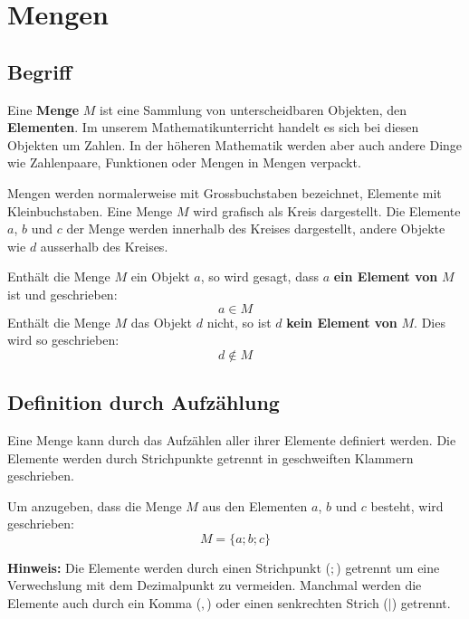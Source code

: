 \newpage
\section{Mengen}

\subsection{Begriff}
Eine \textbf{Menge} $M$ ist eine Sammlung von unterscheidbaren Objekten, den \textbf{Elementen}. Im unserem Mathematikunterricht handelt es sich bei diesen Objekten um Zahlen. In der höheren Mathematik werden aber auch andere Dinge wie Zahlenpaare, Funktionen oder Mengen in Mengen verpackt.


Mengen werden normalerweise mit Grossbuchstaben bezeichnet, Elemente mit Kleinbuchstaben. Eine Menge $M$ wird grafisch als Kreis dargestellt. Die Elemente $a$, $b$  und $c$ der Menge werden innerhalb des Kreises dargestellt, andere Objekte wie $d$ ausserhalb des Kreises.
\begin{center}
\end{center}
Enthält die Menge $M$ ein Objekt $a$, so wird gesagt, dass $a$ \textbf{ein Element von} $M$ ist und geschrieben:
\[
  a \in M
\]
Enthält die Menge $M$ das Objekt $d$ nicht, so ist $d$ \textbf{kein Element von} $M$. Dies wird so geschrieben:
\[
  d \notin M
\]

\subsection{Definition durch Aufzählung}
Eine Menge kann durch das Aufzählen aller ihrer Elemente definiert werden. Die Elemente werden durch Strichpunkte getrennt in geschweiften Klammern geschrieben.

Um anzugeben, dass die Menge $M$ aus den Elementen $a$, $b$ und $c$ besteht, wird geschrieben:
\[
  M = \{ a; b; c \}
\]

\begin{note}
\textbf{Hinweis:} Die Elemente werden durch einen Strichpunkt ($;$) getrennt um eine Verwechslung mit dem Dezimalpunkt zu vermeiden. Manchmal werden die Elemente auch durch ein Komma ($,$) oder einen senkrechten Strich ($|$) getrennt.
\end{note}


